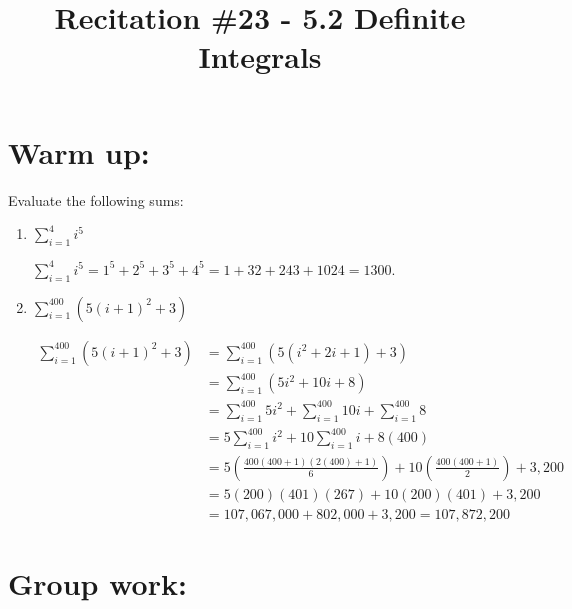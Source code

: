 \documentclass[handout,nooutcomes]{ximera}
\title{Recitation \#23 - 5.2 Definite Integrals}
\begin{document}
\begin{abstract}		\end{abstract}
\maketitle

\section*{Warm up:} 
Evaluate the following sums:
	\begin{enumerate}
	
	\item $\sum_{i=1}^{4} i^5 $
		\begin{freeResponse}
		$\sum_{i=1}^{4} i^5 = 1^5 + 2^5 + 3^5 + 4^5 = 1 + 32 + 243 + 1024 = 1300$.
		\end{freeResponse}	
		
		
		
	\item $\sum_{i=1}^{400} (5(i+1)^2 + 3) $
		\begin{freeResponse}
			\begin{align*}
			\sum_{i=1}^{400} (5(i+1)^2 + 3) &= \sum_{i=1}^{400} (5(i^2 + 2i + 1) + 3) \\
			&= \sum_{i=1}^{400} (5i^2 + 10i + 8) \\
			&= \sum_{i=1}^{400} 5i^2 + \sum_{i=1}^{400} 10i + \sum_{i=1}^{400} 8  \\
			&= 5\sum_{i=1}^{400} i^2 + 10 \sum_{i=1}^{400} i + 8(400)  \\
			&= 5 \left( \frac{400(400+1)(2(400) + 1)}{6} \right) + 10 \left( \frac{400(400+1)}{2} \right) + 3,200  \\
			&= 5 (200)(401)(267) + 10(200)(401) + 3,200  \\
			&= 107,067,000 + 802,000 + 3,200 = 107,872,200
			\end{align*}
		\end{freeResponse}	
		
		
		
	\end{enumerate}
		
		
		

	
	
	
	
	

\section*{Group work:}
\end{document}
